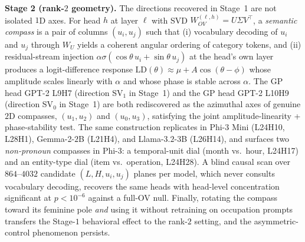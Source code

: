 \textbf{Stage 2 (rank-$2$ geometry).}
The directions recovered in Stage~1 are not isolated $1$D axes. For
head $h$ at layer $\ell$ with SVD
$W_{OV}^{(\ell,h)} = U\Sigma V^{\top}$, a \emph{semantic compass} is a
pair of columns $(u_i, u_j)$ such that (i) vocabulary decoding of
$u_i$ and $u_j$ through $W_U$ yields a coherent angular ordering of
category tokens, and (ii) residual-stream injection
$\alpha\sigma(\cos\theta\,u_i + \sin\theta\,u_j)$ at the head's own
layer produces a logit-difference response
$\mathrm{LD}(\theta) \approx \mu + A\cos(\theta - \phi)$ whose
amplitude scales linearly with $\alpha$ and whose phase is stable
across $\alpha$. The GP head GPT-2 L9H7 (direction SV$_1$ in Stage~1)
and the GP head GPT-2 L10H9 (direction SV$_0$ in Stage~1) are both
rediscovered as the azimuthal axes of genuine $2$D compasses,
$(u_1, u_2)$ and $(u_0, u_3)$, satisfying the joint amplitude-linearity
+ phase-stability test. The same construction replicates in Phi-3
Mini (L24H10, L28H1), Gemma-2-$2$B (L21H4), and Llama-$3.2$-$3$B
(L26H14), and surfaces two \emph{non-pronoun} compasses in Phi-3: a
temporal-unit dial (month vs.\ hour, L24H17) and an entity-type dial
(item vs.\ operation, L24H28). A blind causal scan over
$864$--$4032$ candidate $(L, H, u_i, u_j)$ planes per model, which
never consults vocabulary decoding, recovers the same heads with
head-level concentration significant at $p < 10^{-6}$ against a
full-OV null. Finally, rotating the compass toward its feminine pole
\emph{and} using it without retraining on occupation prompts
transfers the Stage-$1$ behavioral effect to the rank-$2$ setting,
and the asymmetric-control phenomenon persists.

